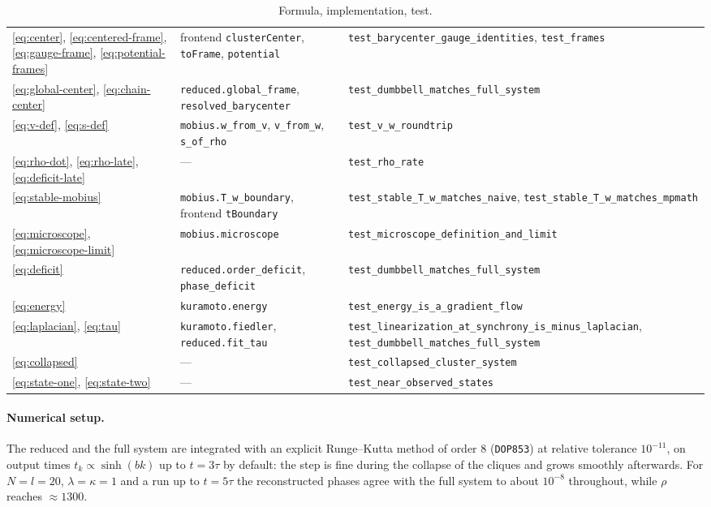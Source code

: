 \documentclass[a4paper,11pt]{article}
\newcommand{\code}[1]{\texttt{#1}}
\theoremstyle{remark}
\begin{document}
\begin{table}[ht]
\begin{tabular}{@{}L{0.25\textwidth}L{0.32\textwidth}L{0.38\textwidth}@{}}
\eqref{eq:center}, \eqref{eq:centered-frame}, \eqref{eq:gauge-frame}, \eqref{eq:potential-frames}
  & frontend \code{clusterCenter}, \code{toFrame}, \code{potential}
  & \code{test\_barycenter\_gauge\_identities}, \code{test\_frames}\\
\eqref{eq:global-center}, \eqref{eq:chain-center} & \code{reduced.global\_frame}, \code{resolved\_barycenter} & \code{test\_dumbbell\_matches\_full\_system}\\
\eqref{eq:v-def}, \eqref{eq:s-def} & \code{mobius.w\_from\_v}, \code{v\_from\_w}, \code{s\_of\_rho} & \code{test\_v\_w\_roundtrip}\\
\eqref{eq:rho-dot}, \eqref{eq:rho-late}, \eqref{eq:deficit-late} & --- & \code{test\_rho\_rate}\\
\eqref{eq:stable-mobius} & \code{mobius.T\_w\_boundary}, frontend \code{tBoundary} & \code{test\_stable\_T\_w\_matches\_naive}, \code{test\_stable\_T\_w\_matches\_mpmath}\\
\eqref{eq:microscope}, \eqref{eq:microscope-limit} & \code{mobius.microscope} & \code{test\_microscope\_definition\_and\_limit}\\
\eqref{eq:deficit} & \code{reduced.order\_deficit}, \code{phase\_deficit} & \code{test\_dumbbell\_matches\_full\_system}\\
\eqref{eq:energy} & \code{kuramoto.energy} & \code{test\_energy\_is\_a\_gradient\_flow}\\
\eqref{eq:laplacian}, \eqref{eq:tau} & \code{kuramoto.fiedler}, \code{reduced.fit\_tau} & \code{test\_linearization\_at\_synchrony\_is\_minus\_laplacian}, \code{test\_dumbbell\_matches\_full\_system}\\
\eqref{eq:collapsed} & --- & \code{test\_collapsed\_cluster\_system}\\
\eqref{eq:state-one}, \eqref{eq:state-two} & --- & \code{test\_near\_observed\_states}\\
\bottomrule
\end{tabular}
\caption{Formula, implementation, test.}
\label{tab:map}
\end{table}

\paragraph{Numerical setup.} The reduced and the full system are integrated
with an explicit Runge--Kutta method of order 8 (\code{DOP853}) at relative
tolerance $10^{-11}$, on output times $t_k\propto\sinh(bk)$ up to $t=3\tau$ by default: the step
is fine during the collapse of the cliques and grows smoothly afterwards. For $N=l=20$, $\lambda=\kappa=1$ and a run up to $t=5\tau$ the
reconstructed phases agree with the full system to about $10^{-8}$ throughout,
while $\rho$ reaches $\approx1300$.
\end{document}
